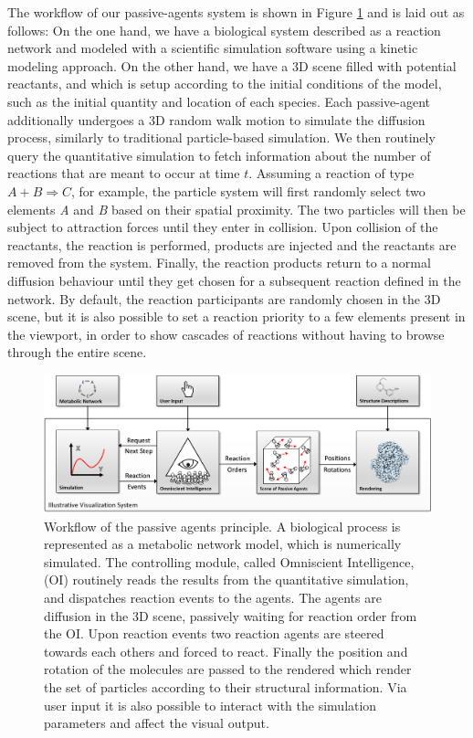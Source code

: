 The workflow of our passive-agents system is shown in Figure \ref{fig:figure21} and is laid out as follows:
On the one hand, we have a biological system described as a reaction network and modeled with a scientific simulation software using a kinetic modeling approach.
On the other hand, we have a 3D scene filled with potential reactants, and which is setup according to the initial conditions of the model, such as the initial quantity and location of each species.
Each passive-agent additionally undergoes a 3D random walk motion to simulate the diffusion process, similarly to traditional particle-based simulation.
We then routinely query the quantitative simulation to fetch information about the number of reactions that are meant to occur at time $t$.
Assuming a reaction of type $A + B \Rightarrow C$, for example, the particle system will first randomly select two elements \textit{A} and \textit{B} based on their spatial proximity.
The two particles will then be subject to attraction forces until they enter in collision.
Upon collision of the reactants, the reaction is performed, products are injected and the reactants are removed from the system.
Finally, the reaction products return to a normal diffusion behaviour until they get chosen for a subsequent reaction defined in the network.
By default, the reaction participants are randomly chosen in the 3D scene, but it is also possible to set a reaction priority to a few elements present in the viewport, in order to show cascades of reactions without having to browse through the entire scene.

\begin{figure}
\centering
\includegraphics[width=0.8\linewidth]{graphics/figure2_1}
\caption{Workflow of the passive agents principle. A biological process is represented as a metabolic network model, which is numerically simulated. The controlling module, called Omniscient Intelligence, (OI) routinely reads the results from the quantitative simulation, and dispatches 	reaction events to the agents. The agents are diffusion in the 3D scene, passively waiting for reaction order from the OI. Upon reaction events two reaction agents are steered towards each others and forced to react. Finally the position and rotation of the molecules are passed to the rendered which render the set of particles according to their structural information. Via user input it is also possible to interact with the simulation parameters and affect the visual output.}
\label{fig:figure21}
\end{figure}

